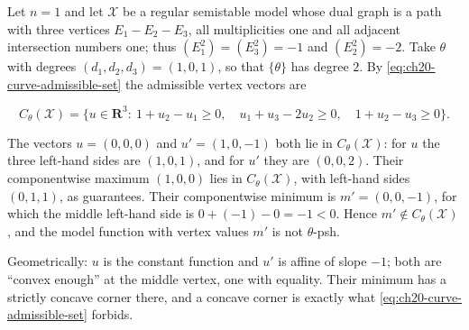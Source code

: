\begin{example}
\label{ex:ch20-min-fails}
Let $n=1$ and let $\mathcal X$ be a regular semistable model whose dual
graph is a path with three vertices $E_1-E_2-E_3$, all multiplicities one
and all adjacent intersection numbers one; thus $(E_1^2)=(E_3^2)=-1$ and
$(E_2^2)=-2$.  Take $\theta$ with degrees $(d_1,d_2,d_3)=(1,0,1)$, so
that $\{\theta\}$ has degree $2$.  By
\eqref{eq:ch20-curve-admissible-set} the admissible vertex vectors are

\[
 C_\theta(\mathcal X)=
 \bigl\{u\in\mathbf R^3:\ 1+u_2-u_1\geq0,\quad
   u_1+u_3-2u_2\geq0,\quad 1+u_2-u_3\geq0\bigr\}.
\]

The vectors $u=(0,0,0)$ and $u'=(1,0,-1)$ both lie in
$C_\theta(\mathcal X)$: for $u$ the three left-hand sides are
$(1,0,1)$, and for $u'$ they are $(0,0,2)$.  Their componentwise
maximum $(1,0,0)$ lies in $C_\theta(\mathcal X)$, with left-hand sides
$(0,1,1)$, as  guarantees.  Their
componentwise minimum is $m'=(0,0,-1)$, for which the middle left-hand
side is $0+(-1)-0=-1<0$.  Hence $m'\notin C_\theta(\mathcal X)$, and the
model function with vertex values $m'$ is not $\theta$-psh.

Geometrically: $u$ is the constant function and $u'$ is affine of slope
$-1$; both are ``convex enough'' at the middle vertex, one with equality.
Their minimum has a strictly concave corner there, and a concave corner is
exactly what \eqref{eq:ch20-curve-admissible-set} forbids.
\end{example}

